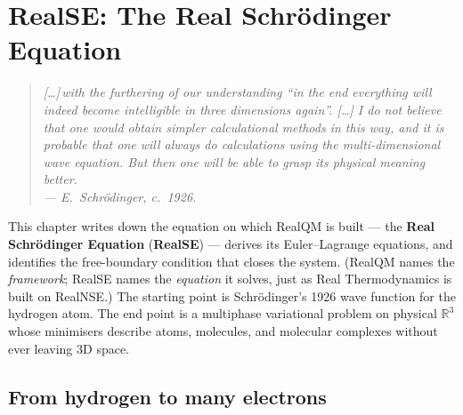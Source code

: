 \chapter{RealSE: The Real Schr\"odinger Equation}\label{ch:equation}


\begin{quote}
\itshape [\ldots]\,with the furthering of our understanding ``in the end everything will indeed become intelligible in three dimensions again''. [\ldots] I do not believe that one would obtain simpler calculational methods in this way, and it is probable that one will always do calculations using the multi-dimensional wave equation. But then one will be able to grasp its physical meaning better.\\
\normalfont\hfill --- E.~Schr\"odinger, c.\ 1926.
\end{quote}
\bigskip

This chapter writes down the equation on which RealQM is built --- the
\textbf{Real Schr\"odinger Equation} (\textbf{RealSE}) --- derives its
Euler--Lagrange equations, and identifies the free-boundary condition that
closes the system. (RealQM names the \emph{framework}; RealSE names the
\emph{equation} it solves, just as Real Thermodynamics is built on RealNSE.) The starting point is Schr\"odinger's 1926 wave function for the hydrogen atom. The end point is a multiphase variational problem on physical $\mathbb{R}^3$ whose minimisers describe atoms, molecules, and molecular complexes without ever leaving 3D space.

\section{From hydrogen to many electrons}

